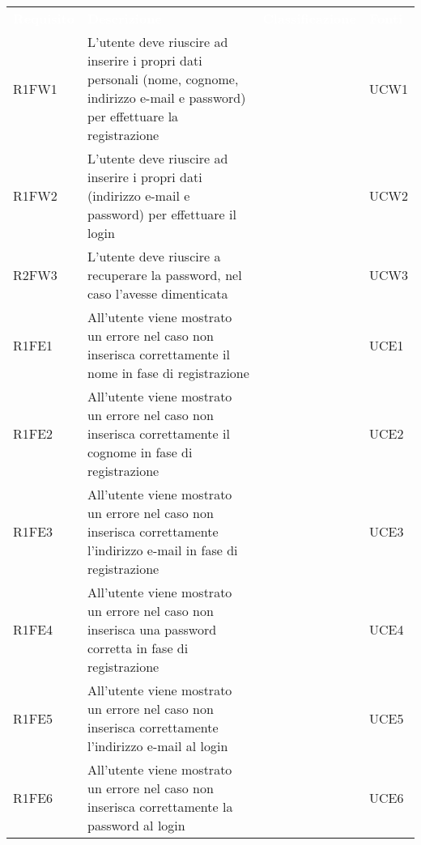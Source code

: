 

\renewcommand{\arraystretch}{1.5}
\begin{longtable}{ m{}<{\centering}  m{}<{\centering}  m{}<{\centering}  m{}<{\centering}}
	\rowcolor{darkblue}
	\textcolor{white}{\textbf{Requisito}} &\textcolor{white}{\textbf{Descrizione}}& \textcolor{white}{\textbf{Classificazione}} & \textcolor{white}{\textbf{Fonti}}\\ 

	R1FW1 & L’utente deve riuscire ad inserire i propri dati personali (nome, cognome, indirizzo e-mail e password) per effettuare la registrazione & \Ob & UCW1 \\	
	 
	R1FW2 & L’utente deve riuscire ad inserire i propri dati (indirizzo e-mail e password) per effettuare il login & \Ob & UCW2\\	

	R2FW3 & L’utente deve riuscire a recuperare la password, nel caso l’avesse dimenticata & \De & UCW3\\	
	 
	R1FE1 & All’utente viene mostrato un errore nel caso non inserisca correttamente il nome in fase di registrazione & \Ob & UCE1\\	
	 
 	R1FE2 & All’utente viene mostrato un errore nel caso non inserisca correttamente il cognome in fase di registrazione & \Ob & UCE2\\	
	 
	R1FE3 & All’utente viene mostrato un errore nel caso non inserisca correttamente l’indirizzo e-mail in fase di registrazione & \Ob & UCE3\\	

	R1FE4 & All’utente viene mostrato un errore nel caso non inserisca una password corretta in fase di registrazione & \Ob & UCE4\\	
	
	R1FE5 & All'utente viene mostrato un errore nel caso non inserisca correttamente l'indirizzo e-mail al login & \Ob & UCE5 \\
	 
	R1FE6 & All'utente viene mostrato un errore nel caso non inserisca correttamente la password al login & \Ob & UCE6 \\	 
	 

\end{longtable}
